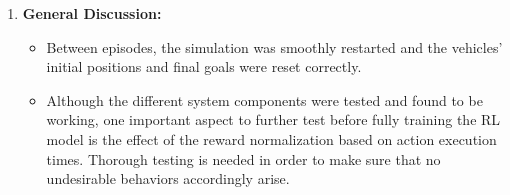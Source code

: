 \begin{enumerate}
    \item \textbf{General Discussion:}
    \begin{itemize}
        \item Between episodes, the simulation was smoothly restarted and the vehicles' initial positions and final goals were reset correctly.
        \item Although the different system components were tested and found to be working, one important aspect to further test before fully training the RL model is the effect of the reward normalization based on action execution times. Thorough testing is needed in order to make sure that no undesirable behaviors accordingly arise. 
    \end{itemize}
\end{enumerate}